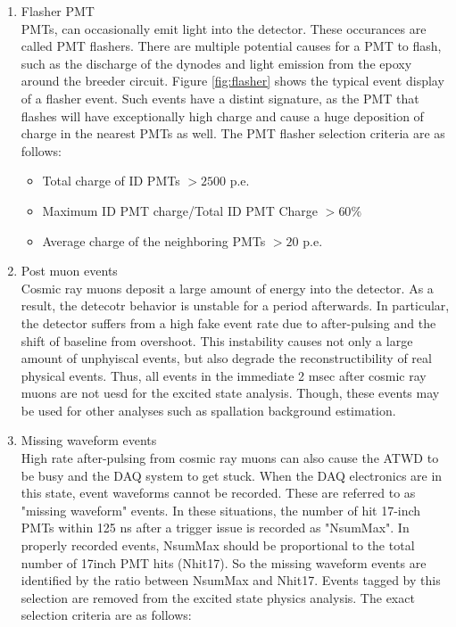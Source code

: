 \begin{enumerate}
	\item Flasher PMT \\
	PMTs, can occasionally emit light into the detector. These occurances are called PMT flashers. There are multiple potential causes for a PMT to flash, such as the discharge of the dynodes and light emission from the epoxy around the breeder circuit. Figure \ref{fig:flasher} shows the typical event display of a flasher event. Such events have a distint signature, as the PMT that flashes will have exceptionally high charge and cause a huge deposition of charge in the nearest PMTs as well. The PMT flasher selection criteria are as follows:
	\begin{itemize}
		\item Total charge of ID PMTs $ > 2500$ p.e.
		\item Maximum ID PMT charge/Total ID PMT Charge $ >60\%$
		\item Average charge of the neighboring PMTs $ > 20$ p.e.
	\end{itemize}
	\item Post muon events \\
	Cosmic ray muons deposit a large amount of energy into the detector. As a result, the detecotr behavior is unstable for a period afterwards. In particular, the detector suffers from a high fake event rate due to after-pulsing and the shift of baseline from overshoot. This instability causes not only a large amount of unphyiscal events, but also degrade the reconstructibility of real physical events. Thus, all events in the immediate 2 msec after cosmic ray muons are not uesd for the excited state analysis. Though, these events may be used for other analyses such as spallation background estimation.
	\item Missing waveform events \\
	High rate after-pulsing from cosmic ray muons can also cause the ATWD to be busy and the DAQ system to get stuck. When the DAQ electronics are in this state, event waveforms cannot be recorded. These are referred to as "missing waveform" events. In these situations, the number of hit 17-inch PMTs within 125 ns after a trigger issue is recorded as "NsumMax". In properly recorded events, NsumMax should be proportional to the total number of 17inch PMT hits (Nhit17). So the missing waveform events are identified by the ratio between NsumMax and Nhit17. Events tagged by this selection are removed from the excited state physics analysis. The exact selection criteria are as follows:

\end{enumerate}
